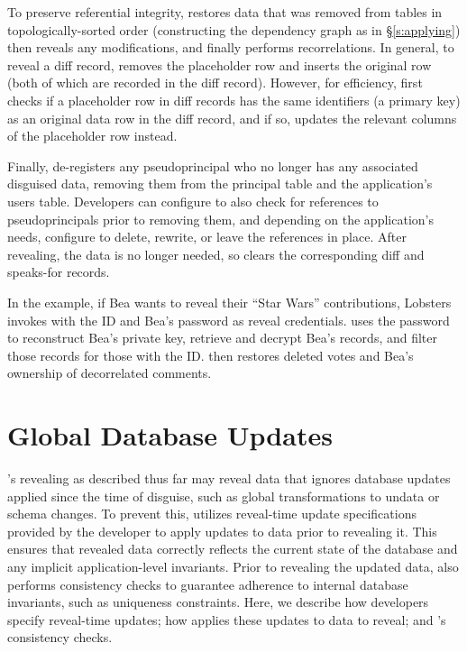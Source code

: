 %
To preserve referential integrity, \sys restores
\xxed data that was removed from tables in topologically-sorted order (constructing the dependency graph as in \S\ref{s:applying})
%
\sys then reveals any modifications, and finally performs recorrelations. 
%
In general, to reveal a diff record, \sys removes the placeholder row
and inserts the original row (both of which are recorded in the diff record).
%
However, for efficiency, \sys first checks if a placeholder row in diff records
has the same identifiers (\eg a primary key) as an original data row in the diff
record, and if so, updates the relevant columns of the placeholder row instead.
%

%
Finally, \sys de-registers any pseudoprincipal who no longer has any associated
disguised data, removing them from the principal table and the application's
users table.
%
Developers can configure \sys to also check for references to pseudoprincipals
prior to removing them, and depending on the application's needs, configure \sys
to delete, rewrite, or leave the references in place.
%
After revealing, the \xxed data is no longer needed, so \sys clears the
corresponding diff and speaks-for records.
%

%
In the example, if Bea wants to reveal their ``Star Wars'' contributions,
Lobsters invokes \sys with the \xx ID and Bea's password as reveal credentials.
%
\sys uses the password to reconstruct Bea's private key, retrieve and decrypt
Bea's records, and filter those records for those with the \xx ID.
%
\sys then restores deleted votes and Bea's ownership of
decorrelated comments.
%

\section{Global Database Updates}
\label{s:design:updates}
\sys's revealing as described thus far may reveal data that ignores
database updates applied since the time of disguise, such as global
transformations to un\xxed data or schema changes.
%
To prevent this, \sys utilizes reveal-time update specifications provided by the
developer to apply updates to \xxed data prior to revealing it. This ensures
that revealed data correctly reflects the current state of the database and any
implicit application-level invariants.
%
Prior to revealing the updated data, \sys also performs consistency checks
to guarantee adherence to internal database invariants, such as uniqueness
constraints.
%
Here, we describe how developers specify reveal-time updates; how \sys applies
these updates to data to reveal; and \sys's consistency checks.

